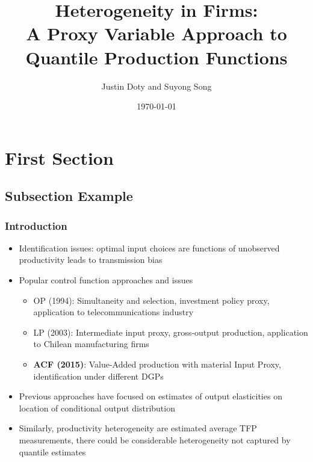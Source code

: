 \documentclass{beamer}
\title[Quantile Production Functions]{Heterogeneity in Firms:\\
A Proxy Variable Approach to Quantile Production Functions}
\author{Justin Doty and Suyong Song} %
\institute[] %
{
\\  
\medskip %
}
\date{\today} %
\begin{document}
\begin{frame}
\titlepage %
\end{frame}


\section{First Section} %

\subsection{Subsection Example} %

\begin{frame}
\frametitle{Introduction}
\begin{itemize}
\item Identification issues: optimal input choices are functions of unobserved productivity leads to transmission bias
\item Popular control function approaches and issues
\begin{itemize}
	\item OP (1994): Simultaneity and selection, investment policy proxy, application to telecommunications industry
	\item LP (2003): Intermediate input proxy, gross-output production, application to Chilean manufacturing firms
	\item \textbf{ACF (2015)}: Value-Added production with material Input Proxy, identification under different DGPs
\end{itemize}
\item Previous approaches have focused on estimates of output elasticities on location of conditional output distribution
\item Similarly, productivity heterogeneity are estimated average TFP measurements, there could be considerable heterogeneity not captured by quantile estimates

\end{itemize}
\end{frame}
\end{document}
